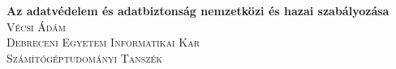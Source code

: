 %
%
%

\begin{titlepage}

\center

{\huge \bfseries {{Az adatvédelem és adatbiztonság nemzetközi és hazai szabályozása}}}\\[1.5cm]

\textsc{\Large {{Vécsi Ádám}}}\\
\textsc{\large {{Debreceni Egyetem Informatikai Kar}}}\\
\textsc{\large {{Számítógéptudományi Tanszék}}}

\vfill

\end{titlepage}
